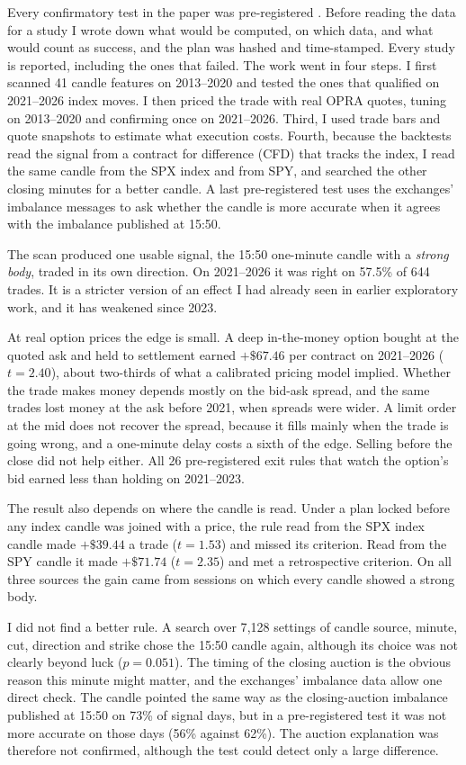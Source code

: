 \documentclass[12pt,letterpaper]{article}
\begin{document}
Every confirmatory test in the paper was pre-registered \citep{nosek2018}.
Before reading the data for a study I wrote down what would be computed, on
which data, and what would count as success, and the plan was hashed and
time-stamped. Every study is reported, including the ones that failed. The work
went in four steps. I first scanned 41 candle features on 2013--2020 and tested
the ones that qualified on 2021--2026 index moves. I then priced the trade with
real OPRA quotes, tuning on 2013--2020 and confirming once on 2021--2026.
Third, I used trade bars and quote snapshots to estimate what execution costs.
Fourth, because the backtests read the signal from a contract for difference
(CFD) that tracks the index, I read the same candle from the SPX index and from
SPY, and searched the other closing minutes for a better candle. A last
pre-registered test uses the exchanges' imbalance messages to ask whether the
candle is more accurate when it agrees with the imbalance published at 15:50.

The scan produced one usable signal, the 15:50 one-minute candle with a
\emph{strong body}, traded in its own direction. On 2021--2026 it was right on
57.5\% of 644 trades. It is a stricter version of an effect I had already seen
in earlier exploratory work, and it has weakened since 2023.

At real option prices the edge is small. A deep
in-the-money option bought at the quoted ask and held to settlement earned
$+\$67.46$ per contract on 2021--2026 ($t = 2.40$), about two-thirds of what a
calibrated pricing model implied. Whether the trade makes money depends mostly on the bid-ask spread, and the
same trades lost money at the ask before 2021, when spreads were wider.
A limit order at the mid does not recover the spread, because it fills mainly
when the trade is going wrong, and a one-minute delay costs a sixth of the edge. Selling before the close did not help either. All 26 pre-registered exit rules
that watch the option's bid earned less than holding on 2021--2023.

The result also depends on where the candle is read. Under a plan locked before
any index candle was joined with a price, the rule read from the SPX index
candle made $+\$39.44$ a trade ($t = 1.53$) and missed its criterion. Read from
the SPY candle it made $+\$71.74$ ($t = 2.35$) and met a retrospective
criterion. On all three sources the gain came from sessions on which every
candle showed a strong body.

I did not find a better rule. A search over 7{,}128 settings of
candle source, minute, cut, direction and strike chose the 15:50 candle again,
although its choice was not clearly beyond luck ($p = 0.051$). The timing of the closing auction is the obvious reason this minute might
matter, and the exchanges' imbalance data allow one direct check. The candle
pointed the same way as the closing-auction imbalance
published at 15:50 on 73\% of signal days, but in a pre-registered test it was not
more accurate on those days (56\% against 62\%). The auction explanation was therefore not confirmed, although the test could detect only a large
difference.
\end{document}
